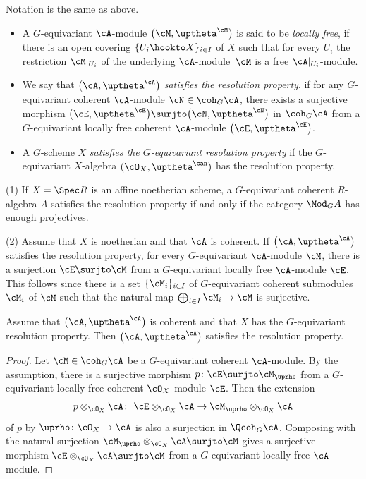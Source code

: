 {\samepage\begin{dfn} Notation is the same as above.
\begin{itemize}\itemsep=0pt
\item[1.] A $G$-equivariant $\cA$-module $\big(\cM,\uptheta^{\cM}\big)$ is said to be {\it locally free}, if there is an open covering $\{U_i\hookto X\}_{i\in I}$ of $X$ such that for every $U_i$ the restriction $\cM|_{U_i}$ of the underlying $\cA$-module~$\cM$ is a free $\cA|_{U_i}$-module.

\item[2.] We say that $\big(\cA,\uptheta^{\cA}\big)$ {\it satisfies the resolution property}, if for any $G$-equivariant coherent $\cA$-module $\cN\in \coh_G\cA$, there exists a surjective morphism $\big(\cE,\uptheta^{\cE}\big)\surjto \big(\cN,\uptheta^{\cN}\big)$ in $\coh_G\cA$ from a $G$-equivariant locally free coherent $\cA$-module $\big(\cE,\uptheta^{\cE}\big)$.
\item[3.] A $G$-scheme $X$ {\it satisfies the $G$-equivariant resolution property} if the $G$-equivariant $X$-al\-ge\-bra $(\cO_X,\uptheta^{\can})$ has the resolution property.
\end{itemize}
\end{dfn}

}

\begin{rem}
(1) If $X=\Spec R$ is an affine noetherian scheme, a $G$-equivariant coherent $R$-algebra $A$ satisfies the resolution property if and only if the category $\Mod_GA$ has enough projectives.

(2) Assume that $X$ is noetherian and that $\cA$ is coherent. If $\big(\cA,\uptheta^{\cA}\big)$ satisfies the resolution property, for every $G$-equivariant $\cA$-module $\cM$, there is a surjection $\cE\surjto \cM$ from a $G$-equivariant locally free $\cA$-module $\cE$. This follows since there is a set $\{\cM_i\}_{i\in I}$ of $G$-equivariant coherent submodules $\cM_i$ of $\cM$ such that the natural map $\bigoplus_{i\in I}\cM_i\to \cM$ is surjective.
\end{rem}


\begin{prop}\label{resol prop}
Assume that $\big(\cA,\uptheta^{\cA}\big)$ is coherent and that $X$ has the $G$-equivariant resolution property. Then $\big(\cA,\uptheta^{\cA}\big)$ satisfies the resolution property.
\begin{proof}
Let $\cM\in \coh_G\cA$ be a $G$-equivariant coherent $\cA$-module. By the assumption, there is a surjective morphism $p\colon \cE\surjto \cM_{\uprho}$ from a $G$-equivariant locally free coherent $\cO_X$-module $\cE$. Then the extension
\begin{gather*}
p\otimes_{\cO_X}\cA\colon\ \cE\otimes _{\cO_X}\cA\to \cM_{\uprho}\otimes_{\cO_X}\cA
\end{gather*}
of $p$ by $\uprho\colon \cO_{X}\to \cA$ is also a surjection in $\Qcoh_G \cA$. Composing with the natural surjection $\cM_{\uprho}\otimes_{\cO_{X}} \cA\surjto \cM$ gives a surjective morphism $\cE\otimes_{\cO_X} \cA\surjto \cM$ from a $G$-equivariant locally free $\cA$-module.
\end{proof}
\end{prop}

